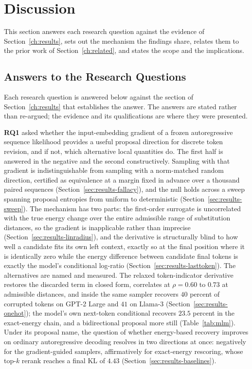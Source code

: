 \section{Discussion}
\label{ch:discussion}

This section answers each research question against the evidence of Section~\ref{ch:results}, sets out the mechanism the findings share, relates them to the prior work of Section~\ref{ch:related}, and states the scope and the implications.

\subsection{Answers to the Research Questions}
\label{sec:disc-rqs}

Each research question is answered below against the section of Section~\ref{ch:results} that establishes the answer. The answers are stated rather than re-argued; the evidence and its qualifications are where they were presented.

\textbf{RQ1} asked whether the input-embedding gradient of a frozen autoregressive sequence likelihood provides a useful proposal direction for discrete token revision, and if not, which alternative local quantities do. The first half is answered in the negative and the second constructively. Sampling with that gradient is indistinguishable from sampling with a norm-matched random direction, certified as equivalence at a margin fixed in advance over a thousand paired sequences (Section~\ref{sec:results-fallacy}), and the null holds across a sweep spanning proposal entropies from uniform to deterministic (Section~\ref{sec:results-sweep}). The mechanism has two parts: the first-order surrogate is uncorrelated with the true energy change over the entire admissible range of substitution distances, so the gradient is inapplicable rather than imprecise (Section~\ref{sec:results-linradius}), and the derivative is structurally blind to how well a candidate fits its own left context, exactly so at the final position where it is identically zero while the energy difference between candidate final tokens is exactly the model's conditional log-ratio (Section~\ref{sec:results-lasttoken}). The alternatives are named and measured. The relaxed token-indicator derivative restores the discarded term in closed form, correlates at $\rho = 0.60$ to $0.73$ at admissible distances, and inside the same sampler recovers $40$ percent of corrupted tokens on GPT-2 Large and $41$ on Llama-3 (Section~\ref{sec:results-onehot}); the model's own next-token conditional recovers $23.5$ percent in the exact-energy chain, and a bidirectional proposal more still (Table~\ref{tab:mlm}). Under its proposal name, the question of whether energy-based recovery improves on ordinary autoregressive decoding resolves in two directions at once: negatively for the gradient-guided samplers, affirmatively for exact-energy rescoring, whose top-$k$ rerank reaches a final KL of $4.43$ (Section~\ref{sec:results-baselines}).

